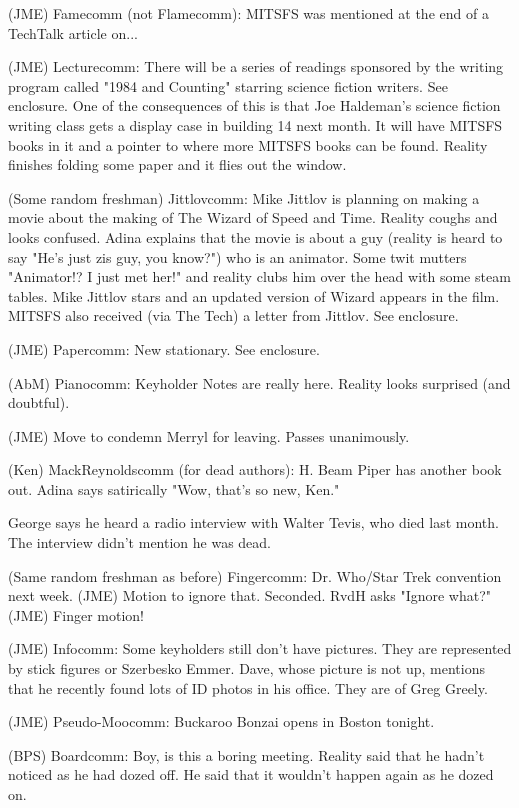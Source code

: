 \documentclass[12pt]{article}
\begin{document}
(JME) Famecomm (not Flamecomm): MITSFS was mentioned at the end of a TechTalk article on...

(JME) Lecturecomm: There will be a series of readings sponsored by the writing program called "1984 and Counting" starring science fiction writers. See enclosure. One of the consequences of this is that Joe Haldeman's science fiction writing class gets a display case in building 14 next month. It will have MITSFS books in it and a pointer to where more MITSFS books can be found. Reality finishes folding some paper and it flies out the window.

(Some random freshman) Jittlovcomm: Mike Jittlov is planning on making a movie about the making of The Wizard of Speed and Time. Reality coughs and looks confused. Adina explains that the movie is about a guy (reality is heard to say "He's just zis guy, you know?") who is an animator. Some twit mutters "Animator!? I just met her!" and reality clubs him over the head with some steam tables. Mike Jittlov stars and an updated version of Wizard appears in the film. MITSFS also received (via The Tech) a letter from Jittlov. See enclosure.

(JME) Papercomm: New stationary. See enclosure.

(AbM) Pianocomm: Keyholder Notes are really here. Reality looks surprised (and doubtful).

(JME) Move to condemn Merryl for leaving. Passes unanimously.

(Ken) MackReynoldscomm (for dead authors): H. Beam Piper has another book out. Adina says satirically "Wow, that's so new, Ken."

George says he heard a radio interview with Walter Tevis, who died last month. The interview didn't mention he was dead.

(Same random freshman as before) Fingercomm: Dr. Who/Star Trek convention next week. (JME) Motion to ignore that. Seconded. RvdH asks "Ignore what?" (JME) Finger motion!

(JME) Infocomm: Some keyholders still don't have pictures. They are represented by stick figures or Szerbesko Emmer. Dave, whose picture is not up, mentions that he recently found lots of ID photos in his office. They are of Greg Greely.

(JME) Pseudo-Moocomm: Buckaroo Bonzai opens in Boston tonight.

(BPS) Boardcomm: Boy, is this a boring meeting. Reality said that he hadn't noticed as he had dozed off. He said that it wouldn't happen again as he dozed on.
\end{document}
